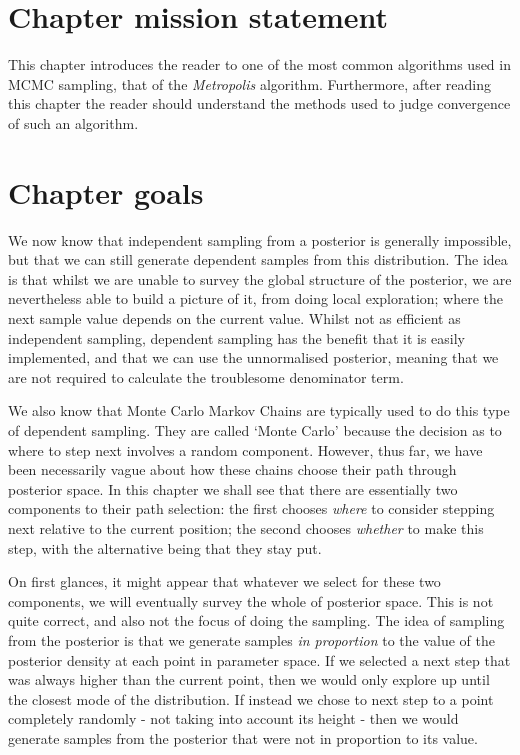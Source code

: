 \documentclass[11pt,fullpage]{book}
\begin{document}
\section{Chapter mission statement}
This chapter introduces the reader to one of the most common algorithms used in MCMC sampling, that of the \textit{Metropolis} algorithm. Furthermore, after reading this chapter the reader should understand the methods used to judge convergence of such an algorithm.

\section{Chapter goals}
We now know that independent sampling from a posterior is generally impossible, but that we can still generate dependent samples from this distribution. The idea is that whilst we are unable to survey the global structure of the posterior, we are nevertheless able to build a picture of it, from doing local exploration; where the next sample value depends on the current value. Whilst not as efficient as independent sampling, dependent sampling has the benefit that it is easily implemented, and that we can use the unnormalised posterior, meaning that we are not required to calculate the troublesome denominator term.

We also know that Monte Carlo Markov Chains are typically used to do this type of dependent sampling. They are called `Monte Carlo' because the decision as to where to step next involves a random component. However, thus far, we have been necessarily vague about how these chains choose their path through posterior space. In this chapter we shall see that there are essentially two components to their path selection: the first chooses \textit{where} to consider stepping next relative to the current position; the second chooses \textit{whether} to make this step, with the alternative being that they stay put. 

On first glances, it might appear that whatever we select for these two components, we will eventually survey the whole of posterior space. This is not quite correct, and also not the focus of doing the sampling. The idea of sampling from the posterior is that we generate samples \textit{in proportion} to the value of the posterior density at each point in parameter space. If we selected a next step that was always higher than the current point, then we would only explore up until the closest mode of the distribution. If instead we chose to next step to a point completely randomly - not taking into account its height - then we would generate samples from the posterior that were not in proportion to its value. 
\end{document}
